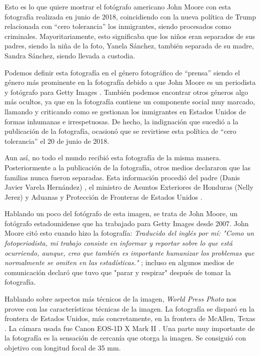 \documentclass[11pt]{article}
\begin{document}
Esto es lo que quiere mostrar el fotógrafo americano John Moore con esta fotografía realizada en junio de 2018, coincidiendo con la nueva política de Trump relacionada con “cero tolerancia” los inmigrantes, siendo procesados como criminales. Mayoritariamente, esto significaba que los niños eran separados de sus padres, siendo la niña de la foto, Yanela Sánchez, también separada de su madre, Sandra Sánchez, siendo llevada a custodia. \newline

Podemos definir esta fotografía en el género fotográfico de “prensa” siendo el género más prominente en la fotografía debido a que John Moore es un periodista y fotógrafo para Getty Images \cite{world-press}. También podemos encontrar otros géneros algo más ocultos, ya que en la fotografía contiene un componente social muy marcado, llamando y criticando como se gestionan los inmigrantes en Estados Unidos de formas inhumanas e irrespetuosas. De hecho, la indignación que sucedió a la publicación de la fotografía, ocasionó que se revirtiese esta política de “cero tolerancia” el 20 de junio de 2018. \cite{hanna-2019} \newline

Aun así, no todo el mundo recibió esta fotografía de la misma manera. Posteriormente a la publicación de la fotografía, otros medios declararon que las familias nunca fueron separadas. Esta información procedió del padre (Danis Javier Varela Hernández) \cite{sacks-2018}, el ministro de Asuntos Exteriores de Honduras (Nelly Jerez) \cite{palencia-2019} y Aduanas y Protección de Fronteras de Estados Unidos \cite{sacks-2018}. \newline

Hablando un poco del fotógrafo de esta imagen, se trata de John Moore, un fotógrafo estadounidense que ha trabajado para Getty Images desde 2007. John Moore citó esto cuando hizo la fotografía: \textit{Traducido del inglés por mí: "Como un fotoperiodista, mi trabajo consiste en informar y reportar sobre lo que está ocurriendo, aunque, creo que también es importante humanizar los problemas que normalmente se omiten en las estadísticas."} \cite{moore-2018}; incluso en algunos medios de comunicación declaró que tuvo que "parar y respirar" \cite{moore-2018} después de tomar la fotografía. \newline

Hablando sobre aspectos más técnicos de la imagen, \textit{World Press Photo} \cite{moore-2018} nos provee con las características técnicas de la imagen. La fotografía se disparó en la frontera de Estados Unidos, más concretamente, en la frontera de McAllen, Texas \cite{einstein}. La cámara usada fue Canon EOS-1D X Mark II \cite{canon}. Una parte muy importante de la fotografía es la sensación de cercanía que otorga la imagen. Se consiguió con objetivo con longitud focal de 35 mm. \newline
\end{document}
